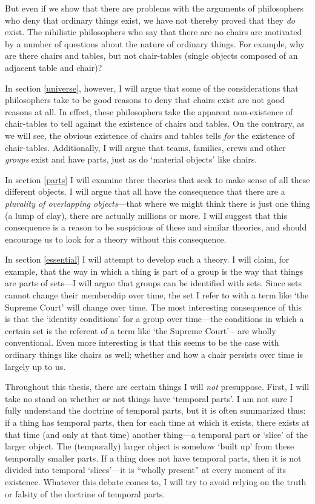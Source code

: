 \documentclass[11pt]{article}
\begin{document}
\begin{spacing}{1.5}
But even if we show that there are problems with the arguments of
philosophers who deny that ordinary things exist, we have not thereby
proved that they {\em do} exist.  The nihilistic philosophers who say
that there are no chairs are motivated by a number of questions about
the nature of ordinary things.  For example, why are there chairs and
tables, but not chair-tables (single objects composed of an adjacent
table and chair)?

In section \ref{universe}, however, I will argue that some of the
considerations that philosophers take to be good reasons to deny that
chairs exist are not good reasons at all.  In effect, these
philosophers take the apparent non-existence of chair-tables to tell
against the existence of chairs and tables.  On the contrary, as we
will see, the obvious existence of chairs and tables tells {\em for}
the existence of chair-tables.  Additionally, I will argue that teams,
families, crews and other {\em groups} exist and have parts, just as
do `material objects' like chairs.

In section \ref{parts} I will examine three theories that seek to make
sense of all these different objects.  I will argue that all have the
consequence that there are a {\em plurality of overlapping
  objects}---that where we might think there is just one thing (a lump
of clay), there are actually millions or more.  I will suggest that
this consequence is a reason to be suspicious of these and similar
theories, and should encourage us to look for a theory without this
consequence.

In section \ref{essential} I will attempt to develop such a theory.  I
will claim, for example, that the way in which a thing is part of a
group is the way that things are parts of sets---I will argue that
groups can be identified with sets.  Since sets cannot change their
membership over time, the set I refer to with a term like `the Supreme
Court' will change over time.  The most interesting consequence of
this is that the `identity conditions' for a group over time---the
conditions in which a certain set is the referent of a term like `the
Supreme Court'---are wholly conventional.  Even more interesting is
that this seems to be the case with ordinary things like chairs as
well; whether and how a chair persists over time is largely up to us.

Throughout this thesis, there are certain things I will {\em not}
presuppose.  First, I will take no stand on whether or not things have
`temporal parts'.  I am not sure I fully understand the doctrine of
temporal parts, but it is often summarized thus: if a thing has
temporal parts, then for each time at which it exists, there exists at
that time (and only at that time) another thing---a temporal part or
`slice' of the larger object.  The (temporally) larger object is
somehow `built up' from these temporally smaller parts.  If a thing
does not have temporal parts, then it is not divided into temporal
`slices'---it is ``wholly present'' at every moment of its existence.
Whatever this debate comes to, I will try to avoid relying on the
truth or falsity of the doctrine of temporal parts.


\end{spacing}
\end{document}
